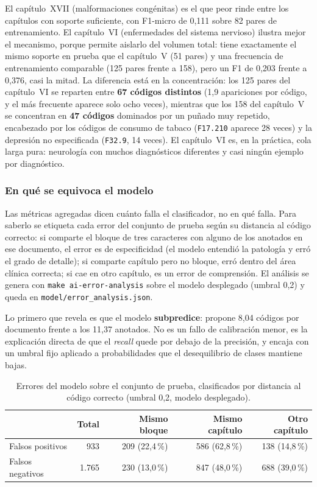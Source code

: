 El capítulo~XVII (malformaciones congénitas) es el que peor rinde entre los capítulos con soporte suficiente, con F1-micro de 0,111 sobre 82 pares de entrenamiento. El capítulo~VI (enfermedades del sistema nervioso) ilustra mejor el mecanismo, porque permite aislarlo del volumen total: tiene exactamente el mismo soporte en prueba que el capítulo~V (51 pares) y una frecuencia de entrenamiento comparable (125 pares frente a 158), pero un F1 de 0,203 frente a 0,376, casi la mitad. La diferencia está en la concentración: los 125 pares del capítulo~VI se reparten entre \textbf{67 códigos distintos} (1,9 apariciones por código, y el más frecuente aparece solo ocho veces), mientras que los 158 del capítulo~V se concentran en \textbf{47 códigos} dominados por un puñado muy repetido, encabezado por los códigos de consumo de tabaco (\texttt{F17.210} aparece 28 veces) y la depresión no especificada (\texttt{F32.9}, 14 veces). El capítulo~VI es, en la práctica, cola larga pura: neurología con muchos diagnósticos diferentes y casi ningún ejemplo por diagnóstico.

\subsubsection*{En qué se equivoca el modelo}

Las métricas agregadas dicen cuánto falla el clasificador, no en qué falla. Para saberlo se etiqueta cada error del conjunto de prueba según su distancia al código correcto: si comparte el bloque de tres caracteres con alguno de los anotados en ese documento, el error es de especificidad (el modelo entendió la patología y erró el grado de detalle); si comparte capítulo pero no bloque, erró dentro del área clínica correcta; si cae en otro capítulo, es un error de comprensión. El análisis se genera con \texttt{make ai-error-analysis} sobre el modelo desplegado (umbral 0,2) y queda en \texttt{model/error\_analysis.json}.

Lo primero que revela es que el modelo \textbf{subpredice}: propone 8,04 códigos por documento frente a los 11,37 anotados. No es un fallo de calibración menor, es la explicación directa de que el \emph{recall} quede por debajo de la precisión, y encaja con un umbral fijo aplicado a probabilidades que el desequilibrio de clases mantiene bajas.

\begin{table}[h]
\centering
\small
\caption{Errores del modelo sobre el conjunto de prueba, clasificados por distancia al código correcto (umbral 0,2, modelo desplegado).}
\label{tab:analisis-error}
\begin{tabular}{lrrrr}
\hline
 & \textbf{Total} & \textbf{Mismo bloque} & \textbf{Mismo capítulo} & \textbf{Otro capítulo} \\
\hline
Falsos positivos & 933 & 209 (22,4\,\%) & 586 (62,8\,\%) & 138 (14,8\,\%) \\
Falsos negativos & 1.765 & 230 (13,0\,\%) & 847 (48,0\,\%) & 688 (39,0\,\%) \\
\hline
\end{tabular}
\end{table}

